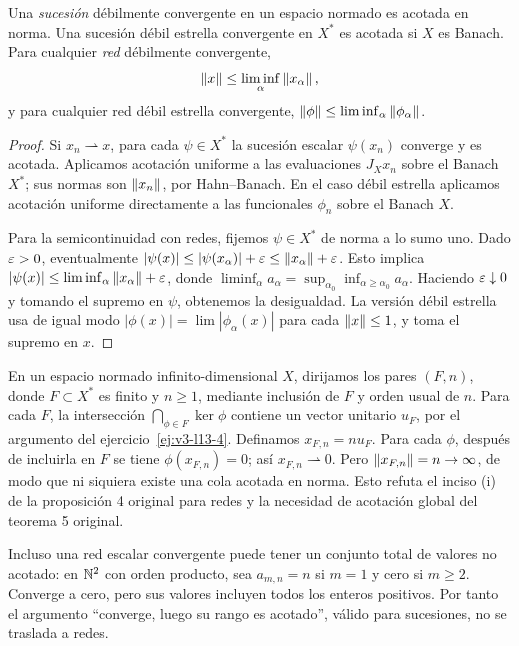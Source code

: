\begin{proposicion}\label{v3:debil-acotacion-secuencias}
Una \emph{sucesión} débilmente convergente en un espacio normado es acotada en norma. Una sucesión débil estrella convergente en $X^*$ es acotada si $X$ es Banach. Para cualquier \emph{red} débilmente convergente,
\[\left\lVert x\right\rVert\le\liminf_\alpha\left\lVert x_\alpha\right\rVert,
\]
y para cualquier red débil estrella convergente, $\left\lVert\phi\right\rVert\le\liminf_\alpha\left\lVert\phi_\alpha\right\rVert$.
\end{proposicion}
\begin{proof}
Si $x_n\rightharpoonup x$, para cada $\psi\in X^*$ la sucesión escalar $\psi(x_n)$ converge y es acotada. Aplicamos acotación uniforme a las evaluaciones $J_Xx_n$ sobre el Banach $X^*$; sus normas son $\left\lVert x_n\right\rVert$, por Hahn--Banach. En el caso débil estrella aplicamos acotación uniforme directamente a las funcionales $\phi_n$ sobre el Banach $X$.

Para la semicontinuidad con redes, fijemos $\psi\in X^*$ de norma a lo sumo uno. Dado $\varepsilon>0$, eventualmente $|\psi(x)|\le|\psi(x_\alpha)|+\varepsilon\le\left\lVert x_\alpha\right\rVert+\varepsilon$. Esto implica $|\psi(x)|\le\liminf_\alpha\left\lVert x_\alpha\right\rVert+\varepsilon$, donde $\liminf_\alpha a_\alpha=\sup_{\alpha_0}\inf_{\alpha\ge\alpha_0}a_\alpha$. Haciendo $\varepsilon\downarrow0$ y tomando el supremo en $\psi$, obtenemos la desigualdad. La versión débil estrella usa de igual modo $|\phi(x)|=\lim|\phi_\alpha(x)|$ para cada $\left\lVert x\right\rVert\le1$, y toma el supremo en $x$.
\end{proof}

\begin{ejemplo}\label{v3:red-debil-no-acotada}
En un espacio normado infinito-dimensional $X$, dirijamos los pares $(F,n)$, donde $F\subset X^*$ es finito y $n\ge1$, mediante inclusión de $F$ y orden usual de $n$. Para cada $F$, la intersección $\bigcap_{\phi\in F}\ker\phi$ contiene un vector unitario $u_F$, por el argumento del ejercicio~\ref{ej:v3-l13-4}. Definamos $x_{F,n}=nu_F$. Para cada $\phi$, después de incluirla en $F$ se tiene $\phi(x_{F,n})=0$; así $x_{F,n}\rightharpoonup0$. Pero $\left\lVert x_{F,n}\right\rVert=n\to\infty$, de modo que ni siquiera existe una cola acotada en norma. Esto refuta el inciso (i) de la proposición 4 original para redes y la necesidad de acotación global del teorema 5 original.

Incluso una red escalar convergente puede tener un conjunto total de valores no acotado: en $\mathbb N^2$ con orden producto, sea $a_{m,n}=n$ si $m=1$ y cero si $m\ge2$. Converge a cero, pero sus valores incluyen todos los enteros positivos. Por tanto el argumento ``converge, luego su rango es acotado'', válido para sucesiones, no se traslada a redes.
\end{ejemplo}

